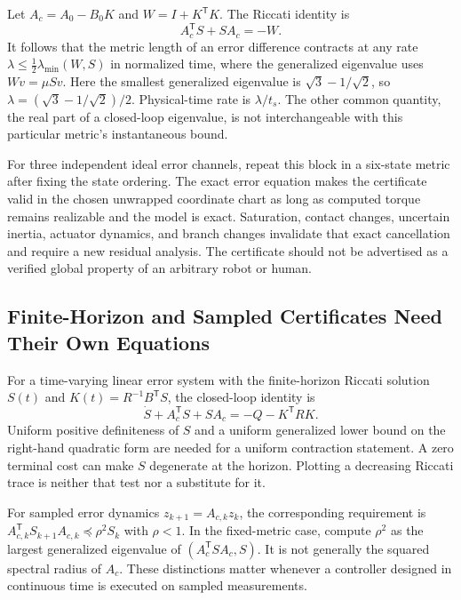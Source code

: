 Let $A_c=A_0-B_0K$ and $W=I+K^{\mathsf T}K$. The Riccati identity is
\begin{equation}
 A_c^{\mathsf T}S+SA_c=-W.
\end{equation}
It follows that the metric length of an error difference contracts at any rate $\lambda\le\tfrac12\lambda_{\min}(W,S)$ in normalized time, where the generalized eigenvalue uses $Wv=\mu Sv$. Here the smallest generalized eigenvalue is $\sqrt3-1/\sqrt2$, so $\lambda=(\sqrt3-1/\sqrt2)/2$. Physical-time rate is $\lambda/t_s$. The other common quantity, the real part of a closed-loop eigenvalue, is not interchangeable with this particular metric's instantaneous bound.

For three independent ideal error channels, repeat this block in a six-state metric after fixing the state ordering. The exact error equation makes the certificate valid in the chosen unwrapped coordinate chart as long as computed torque remains realizable and the model is exact. Saturation, contact changes, uncertain inertia, actuator dynamics, and branch changes invalidate that exact cancellation and require a new residual analysis. The certificate should not be advertised as a verified global property of an arbitrary robot or human.

\subsection{Finite-Horizon and Sampled Certificates Need Their Own Equations}

For a time-varying linear error system with the finite-horizon Riccati solution $S(t)$ and $K(t)=R^{-1}B^{\mathsf T}S$, the closed-loop identity is
\begin{equation}
 \dot S+A_c^{\mathsf T}S+SA_c=-Q-K^{\mathsf T}RK.
\end{equation}
Uniform positive definiteness of $S$ and a uniform generalized lower bound on the right-hand quadratic form are needed for a uniform contraction statement. A zero terminal cost can make $S$ degenerate at the horizon. Plotting a decreasing Riccati trace is neither that test nor a substitute for it.

For sampled error dynamics $z_{k+1}=A_{c,k}z_k$, the corresponding requirement is $A_{c,k}^{\mathsf T}S_{k+1}A_{c,k}\preceq\rho^2 S_k$ with $\rho<1$. In the fixed-metric case, compute $\rho^2$ as the largest generalized eigenvalue of $(A_c^{\mathsf T}SA_c,S)$. It is not generally the squared spectral radius of $A_c$. These distinctions matter whenever a controller designed in continuous time is executed on sampled measurements.


